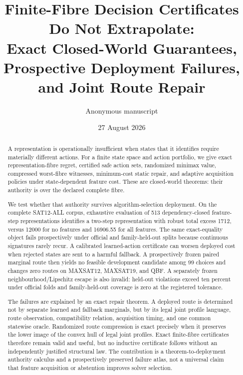 \documentclass[11pt]{article}
\title{Finite-Fibre Decision Certificates Do Not Extrapolate:\\
Exact Closed-World Guarantees, Prospective Deployment Failures, and Joint Route Repair}
\author{Anonymous manuscript}
\date{27 August 2026}
\theoremstyle{definition}
\theoremstyle{remark}
\begin{document}
\maketitle

\begin{abstract}
A representation is operationally insufficient when states that it identifies require materially different actions.  For a finite state space and action portfolio, we give exact representation-fibre regret, certified safe action sets, randomized minimax value, compressed worst-fibre witnesses, minimum-cost static repair, and adaptive acquisition policies under state-dependent feature cost.  These are closed-world theorems: their authority is over the declared complete fibre.

We test whether that authority survives algorithm-selection deployment.  On the complete SAT12-ALL corpus, exhaustive evaluation of 513 dependency-closed feature-step representations identifies a two-step representation with robust total excess 1712, versus 12000 for no features and 16906.55 for all features.  The same exact-equality object fails prospectively under official and family-held-out splits because continuous signatures rarely recur.  A calibrated learned-action certificate can worsen deployed cost when rejected states are sent to a harmful fallback.  A prospectively frozen paired marginal route then yields no feasible development candidate among 99 choices and changes zero routes on MAXSAT12, MAXSAT19, and QBF.  A separately frozen neighbourhood/Lipschitz escape is also invalid: held-out violations exceed ten percent under official folds and family-held-out coverage is zero at the registered tolerance.

The failures are explained by an exact repair theorem.  A deployed route is determined not by separate learned and fallback marginals, but by its legal joint profile language, route observation, compatibility relation, acquisition timing, and one common statewise oracle.  Randomized route compression is exact precisely when it preserves the lower image of the convex hull of legal joint profiles.  Exact finite-fibre certificates therefore remain valid and useful, but no inductive certificate follows without an independently justified structural law.  The contribution is a theorem-to-deployment authority calculus and a prospectively preserved failure atlas, not a universal claim that feature acquisition or abstention improves solver selection.
\end{abstract}
\end{document}
